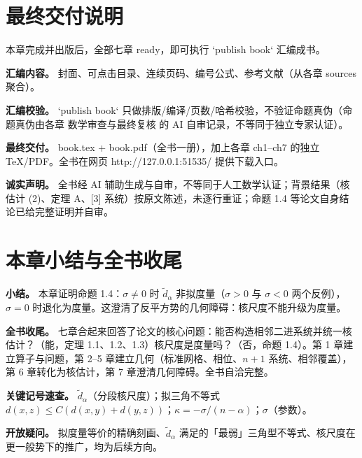 \documentclass[a4paper,11pt,openany]{ctexbook}
\numberwithin{equation}{chapter}
\numberwithin{figure}{chapter}
\numberwithin{table}{chapter}
\begin{document}
\section{最终交付说明}

本章完成并出版后，全部七章 ready，即可执行 `publish book` 汇编成书。

\textbf{汇编内容。} 封面、可点击目录、连续页码、编号公式、参考文献（从各章 sources 聚合）。

\textbf{汇编校验。} `publish book` 只做排版/编译/页数/哈希校验，不验证命题真伪（命题真伪由各章 数学审查与最终复核 的 AI 自审记录，不等同于独立专家认证）。

\textbf{最终交付。} book.tex + book.pdf（全书一册），加上各章 ch1–ch7 的独立 TeX/PDF。全书在网页 http://127.0.0.1:51535/ 提供下载入口。

\textbf{诚实声明。} 全书经 AI 辅助生成与自审，不等同于人工数学认证；背景结果（核估计 (2)、定理 A、[3] 系统）按原文陈述，未逐行重证；命题 1.4 等论文自身结论已给完整证明并自审。

\section{本章小结与全书收尾}

\textbf{小结。} 本章证明命题 1.4：$\sigma\neq0$ 时 $\widetilde d_\alpha$ 非拟度量（$\sigma>0$ 与 $\sigma<0$ 两个反例），$\sigma=0$ 时退化为度量。这澄清了反平方势的几何障碍：核尺度不能升级为度量。

\textbf{全书收尾。} 七章合起来回答了论文的核心问题：能否构造相邻二进系统并统一核估计？（能，定理 1.1、1.2、1.3）核尺度是度量吗？（否，命题 1.4）。第 1 章建立算子与问题，第 2–5 章建立几何（标准网格、相位、$n+1$ 系统、相邻覆盖），第 6 章转化为核估计，第 7 章澄清几何障碍。全书自洽完整。

\textbf{关键记号速查。} $\widetilde d_\alpha$（分段核尺度）；拟三角不等式 $d(x,z)\le C(d(x,y)+d(y,z))$；$\kappa=-\sigma/(n-\alpha)$；$\sigma$（参数）。

\textbf{开放疑问。} 拟度量等价的精确刻画、$\widetilde d_\alpha$ 满足的「最弱」三角型不等式、核尺度在更一般势下的推广，均为后续方向。



\clearpage
\end{document}
